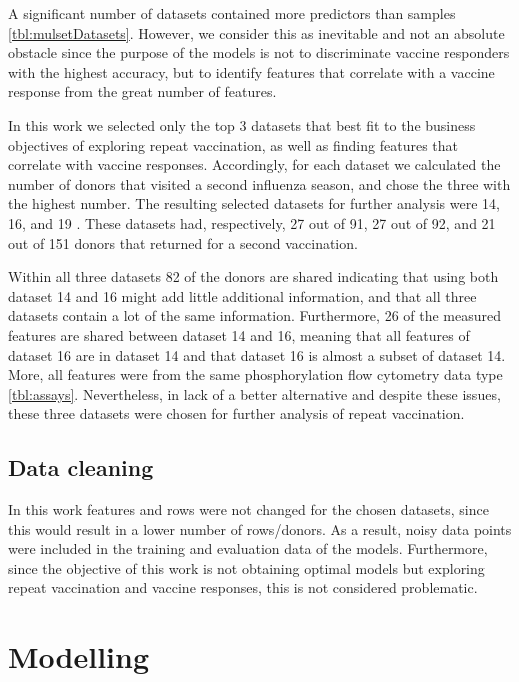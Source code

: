A significant number of datasets contained more predictors than samples \autoref{tbl:mulsetDatasets}.
However, we consider this as inevitable and not an absolute obstacle since the purpose of the models is not to discriminate vaccine responders with the highest accuracy, but to identify features that correlate with a vaccine response from the great number of features.

In this work we selected only the top 3 datasets that best fit to the business objectives of exploring repeat vaccination, as well as finding features that correlate with vaccine responses.
Accordingly, for each dataset we calculated the number of donors that visited a second influenza season, and chose the three with the highest number.
The resulting selected datasets for further analysis were 14, 16, and 19 .
These datasets had, respectively,  27 out of 91, 27 out of 92, and 21 out of 151 donors that returned for a second vaccination.

Within all three datasets 82 of the donors are shared indicating that using both dataset 14 and 16 might add little additional information, and that all three datasets contain a lot of the same information.
Furthermore, 26 of the measured features are shared between dataset 14 and 16, meaning that all features of dataset 16 are in dataset 14 and that dataset 16 is almost a subset of dataset 14.
More, all features were from the same  phosphorylation flow cytometry data type \autoref{tbl:assays}.
Nevertheless, in lack of a better alternative and despite these issues, these three datasets were chosen for further analysis of repeat vaccination.

\subsection{Data cleaning}

In this work features and rows were not changed for the chosen datasets, since this would result in a lower number of rows/donors.
As a result, noisy data points were included in the training and evaluation data of the models.
Furthermore, since the objective of this work is not obtaining optimal models but exploring repeat vaccination and vaccine responses, this is not considered problematic.

\section{Modelling}


